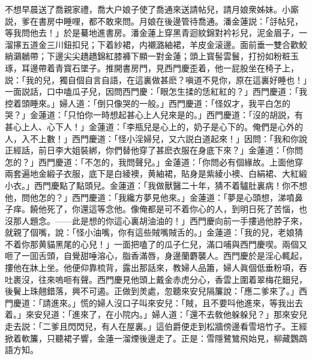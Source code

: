 不想早晨送了喬親家禮，喬大户娘子使了喬通來送請帖兒，請月娘衆姊妹。小廝説，爹在書房中睡哩，都不敢來問。月娘在後邊管待喬通。潘金蓮説：「㧱帖兒，等我問他去！」於是驀地進書房。潘金蓮上穿黑青迴紋錦對衿衫兒，泥金眉子，一溜㩟五道金三川鈕扣兒；下着紗裙，内襯潞紬裙，羊皮金滚邊。面前垂一雙合歡鮫綃鸂鶒帶；下邊尖尖趫趫錦紅膝褲下顯一對金蓮；頭上寳髻雲鬟，打扮如粉粧玉琢，耳邊帶着青寳石墜子。推開書房門，見西門慶歪着，他一屁股坐在椅子上，説：「我的兒，獨自個自言自語，在這裏做甚麽？嗔道不見你，原在這裏好睡也！」一面説話，口中嗑瓜子兒，因問西門慶：「眼怎生揉的恁紅紅的？」西門慶道：「我控着頭睡來。」婦人道：「倒只像哭的一般。」西門慶道：「怪奴才，我平白怎的哭？」金蓮道：「只怕你一時想起甚心上人兒來是的。」西門慶道：「沒的胡説，有甚心上人、心下人！」金蓮道：「李瓶兒是心上的，奶子是心下的。俺們是心外的人，入不上數！」西門慶道：「怪小淫婦兒，又六説白道起來！」因問：「我和你說正經話，前日李大姐裝綁，你們替他穿了甚麽衣服在身底下來？」金蓮道：「你問怎的？」西門慶道：「不怎的，我問聲兒。」金蓮道：「你問必有個緣故。上面他穿兩套遍地金緞子衣服，底下是白綾襖，黄紬裙，貼身是紫綾小襖、白絹裙、大紅緞小衣。」西門慶點了點頭兒。金蓮道：「我做獸醫二十年，猜不着驢肚裏病！你不想他，問他怎的？」西門慶道：「我纔方夢見他來。」金蓮道：「夢是心頭想，涕噴鼻子痒。饒他死了，你還這等念他。像俺都是可不着你心的人，到明日死了苦惱，也沒那人題念。——此是想的你這心裏胡油油的！」西門慶向前一手摟過他脖子來，就親了個嘴，說：「怪小油嘴，你有這些賊嘴賊舌的。」金蓮道：「我的兒，老娘猜不着你那黄貓黑尾的心兒！」一面把嗑了的瓜子仁兒，滿口哺與西門慶喫。兩個又咂了一囬舌頭，自覺甜唾溶心，脂香滿唇，身邊蘭麝襲人。西門慶於是淫心輒起，摟他在牀上坐。他便仰靠梳背，露出那話來，教婦人品簫，婦人眞個低垂粉項，吞吐裹沒，往來嗚咂有聲。西門慶見他頭上戴金赤虎分心，香雲上圍着翠梅花鈿兒，後鬢上珠翹錯落，興不可遏。正做到羙處，忽聽來安兒隔簾說：「應二爹來了。」西門慶道：「請進來。」慌的婦人沒口子叫來安兒：「賊，且不要呌他進來，等我出去着。」來安兒道：「進來了，在小院内。」婦人道：「還不去敎他躲躲兒？」那來安兒走去説：「二爹且閃閃兒，有人在屋裏。」這伯爵便走到松牆傍邊看雪培竹子。王經掀着軟簾，只聽裙子響，金蓮一溜煙後邊走了。正是：雪隱鷺鷥飛始見，柳藏鸚鵡語方知。

